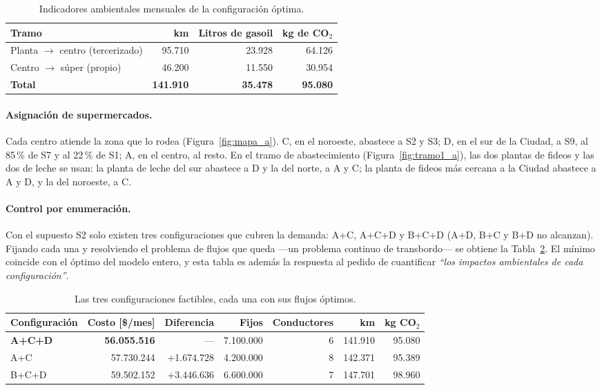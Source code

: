 \documentclass[10pt,a4paper]{article}
\newcommand{\cita}[1]{\emph{``#1''}}
\begin{document}
\begin{table}[H]
\centering\small
\caption{Indicadores ambientales mensuales de la configuración óptima.}
\label{tab:ambiental_a}
\begin{tabular}{lrrr}
\toprule
\textbf{Tramo} & \textbf{km} & \textbf{Litros de gasoil} & \textbf{kg de CO$_2$} \\
\midrule
Planta $\to$ centro (tercerizado)  & 95.710  & 23.928 & 64.126 \\
Centro $\to$ súper (propio)        & 46.200  & 11.550 & 30.954 \\
\midrule
\textbf{Total}                     & \textbf{141.910} & \textbf{35.478} & \textbf{95.080} \\
\bottomrule
\end{tabular}
\end{table}

\paragraph{Asignación de supermercados.} Cada centro atiende la zona que lo
rodea (Figura~\ref{fig:mapa_a}). C, en el noroeste, abastece a S2 y S3; D, en
el sur de la Ciudad, a S9, al 85\,\% de S7 y al 22\,\% de S1; A, en el centro,
al resto. En el tramo de abastecimiento (Figura~\ref{fig:tramo1_a}), las dos
plantas de fideos y las dos de leche se usan: la planta de leche del sur
abastece a D y la del norte, a A y C; la planta de fideos más cercana a la
Ciudad abastece a A y D, y la del noroeste, a C.

\paragraph{Control por enumeración.} Con el supuesto S2 solo existen tres
configuraciones que cubren la demanda: A+C, A+C+D y B+C+D (A+D, B+C y B+D no
alcanzan). Fijando cada una y resolviendo el problema de flujos que queda
—un problema continuo de transbordo— se obtiene la Tabla~\ref{tab:configuraciones}.
El mínimo coincide con el óptimo del modelo entero, y esta tabla es además la
respuesta al pedido de cuantificar \cita{los impactos ambientales de cada
configuración}.

\begin{table}[H]
\centering\small
\caption{Las tres configuraciones factibles, cada una con sus flujos óptimos.}
\label{tab:configuraciones}
\begin{tabular}{lrrrrrr}
\toprule
\textbf{Configuración} & \textbf{Costo [\$/mes]} & \textbf{Diferencia} & \textbf{Fijos} & \textbf{Conductores} & \textbf{km} & \textbf{kg CO$_2$} \\
\midrule
\textbf{A+C+D} & \textbf{56.055.516} & --- & 7.100.000 & 6 & 141.910 & 95.080 \\
A+C            & 57.730.244 & +1.674.728 & 4.200.000 & 8 & 142.371 & 95.389 \\
B+C+D          & 59.502.152 & +3.446.636 & 6.600.000 & 7 & 147.701 & 98.960 \\
\bottomrule
\end{tabular}
\end{table}
\end{document}
